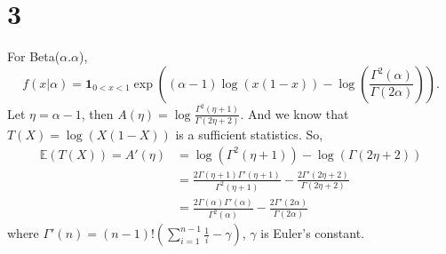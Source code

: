 \documentclass[en,12pt]{elegantpaper}
\begin{document}
    \section*{3}
    \noindent For Beta($\alpha. \alpha$), 
    \[
        f(x|\alpha)=\mathbf{1}_{0<x<1}\exp\left((\alpha-1)\log(x(1-x))-\log\left(\frac{\Gamma^2(\alpha)}{\Gamma(2\alpha)}\right)\right). 
    \]
    Let $\eta=\alpha-1$, then $A(\eta)=\log\frac{\Gamma^2(\eta+1)}{\Gamma(2\eta+2)}$. And we know that $T(X)=\log(X(1-X))$ is a sufficient statistics. So, 
    \[
        \begin{aligned}
            \mathbb{E}(T(X))=A'(\eta){}&=\log(\Gamma^2(\eta+1))-\log(\Gamma(2\eta+2))\\&=\frac{2\Gamma(\eta+1)\Gamma'(\eta+1)}{\Gamma^2(\eta+1)}-\frac{2\Gamma'(2\eta+2)}{\Gamma(2\eta+2)}\\
            &=\frac{2\Gamma(\alpha)\Gamma'(\alpha)}{\Gamma^2(\alpha)}-\frac{2\Gamma'(2\alpha)}{\Gamma(2\alpha)}
        \end{aligned}
    \]
    where $\Gamma'(n)=(n-1)!\left(\sum_{i=1}^{n-1}\frac{1}{i}-\gamma\right)$, $\gamma$ is Euler's constant. 
\end{document}
